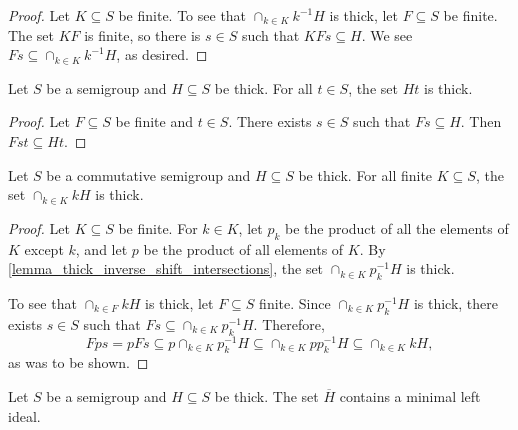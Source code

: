 \begin{proof}
    Let $K \subseteq S$ be finite.  To see that $\cap_{k \in K} k^{-1} H$ is thick, let $F \subseteq S$ be finite.  The set $KF$ is finite, so there is $s \in S$ such that $KFs \subseteq H$. We see $Fs \subseteq \cap_{k \in K} k^{-1} H$, as desired.
\end{proof}

\begin{lemma}
    \label{lemma_thick_right_shift_is_thick}
    Let $S$ be a semigroup and $H \subseteq S$ be thick.  For all $t \in S$, the set $Ht$ is thick.
\end{lemma}

\begin{proof}
    Let $F \subseteq S$ be finite and $t \in S$.  There exists $s \in S$ such that $Fs \subseteq H$.  Then $Fst \subseteq Ht$.
\end{proof}

\begin{lemma}
    \label{lemma_thick_shift_intersections}
    \leanok{}
    Let $S$ be a commutative semigroup and $H \subseteq S$ be thick. For all finite $K \subseteq S$, the set $\cap_{k \in K} kH$ is thick.
\end{lemma}


\begin{proof}
    Let $K \subseteq S$ be finite.  For $k \in K$, let $p_k$ be the product of all the elements of $K$ except $k$, and let $p$ be the product of all elements of $K$.  By \cref{lemma_thick_inverse_shift_intersections}, the set $\cap_{k \in K} p_k^{-1} H$ is thick.
    
    To see that $\cap_{k \in F} kH$ is thick, let $F \subseteq S$ finite.  Since $\cap_{k \in K} p_k^{-1} H$ is thick, there exists $s \in S$ such that $Fs \subseteq \cap_{k \in K} p_k^{-1} H$.  Therefore,
    \[Fps = p F s \subseteq p \cap_{k \in K} p_k^{-1} H \subseteq \cap_{k \in K} p p_k^{-1} H \subseteq \cap_{k \in K} k H,\]
    as was to be shown. 
\end{proof}

\begin{lemma}
    \label{lemma_thick_closure_contains_ideal}
    \leanok{}
    Let $S$ be a semigroup and $H \subseteq S$ be thick.  The set $\overline{H}$ contains a minimal left ideal.
\end{lemma}

